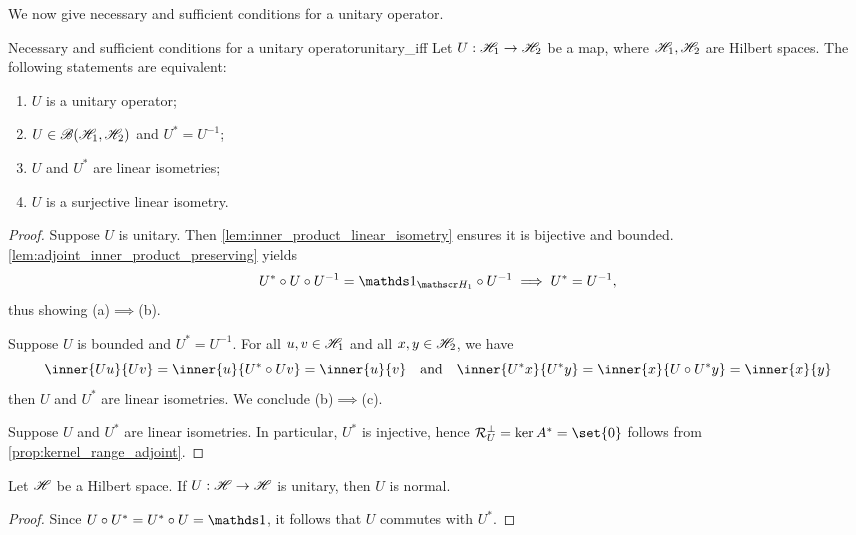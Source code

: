 We now give necessary and sufficient conditions for a unitary operator.
\begin{theorem}{Necessary and sufficient conditions for a unitary operator}{unitary_iff}
    Let \(U : \mathscr{H}_1 \to \mathscr{H}_2\) be a map, where \(\mathscr{H}_1, \mathscr{H}_2\) are Hilbert spaces. The following statements are equivalent:
    \begin{enumerate}[label=(\alph*)]
        \item \(U\) is a unitary operator;
        \item \(U \in \mathscr{B}(\mathscr{H}_1, \mathscr{H}_2)\) and \(U^* = U^{-1}\);
        \item \(U\) and \(U^*\) are linear isometries;
        \item \(U\) is a surjective linear isometry.
    \end{enumerate}
\end{theorem}
\begin{proof}
    Suppose \(U\) is unitary. Then \cref{lem:inner_product_linear_isometry} ensures it is bijective and bounded. \cref{lem:adjoint_inner_product_preserving} yields
    \begin{equation*}
        U^* \circ U \circ U^{-1} = \unity_{\hilbert_1} \circ U^{-1} \implies U^* = U^{-1},
    \end{equation*}
    thus showing (a)\(\implies\)(b).

    Suppose \(U\) is bounded and \(U^* = U^{-1}\). For all \(u, v \in \mathscr{H}_1\) and all \(x, y \in \mathscr{H}_2\), we have
    \begin{equation*}
        \inner{Uu}{Uv} = \inner{u}{U^*\circ Uv} = \inner{u}{v}
        \quad\text{and}\quad
        \inner{U^*x}{U^*y} = \inner{x}{U\circ U^*y} = \inner{x}{y}
    \end{equation*}
    then \(U\) and \(U^*\) are linear isometries. We conclude (b)\(\implies\)(c).

    Suppose \(U\) and \(U^*\) are linear isometries. In particular, \(U^*\) is injective, hence \(\range{U}^\perp = \ker{A^*} = \set{0}\) follows from \cref{prop:kernel_range_adjoint}.
\end{proof}
\begin{corollary}
    Let \(\mathscr{H}\) be a Hilbert space. If \(U : \mathscr{H} \to \mathscr{H}\) is unitary, then \(U\) is normal.
\end{corollary}
\begin{proof}
    Since \(U \circ U^* = U^* \circ U = \unity\), it follows that \(U\) commutes with \(U^*\).
\end{proof}

